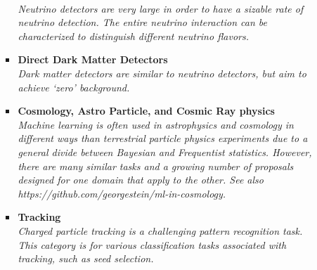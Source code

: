 \documentclass[12pt,letterpaper]{article}
\begin{document}
\begin{itemize}
\begin{itemize}
\begin{itemize}
			\\\textit{Neutrino detectors are very large in order to have a sizable rate of neutrino detection.  The entire neutrino interaction can be characterized to distinguish different neutrino flavors.}
			\item \textbf{Direct Dark Matter Detectors}~\cite{Ilyasov_2020,Akerib:2020aws,Khosa:2019qgp,Golovatiuk:2021lqn,McDonald:2021hus,Coarasa:2021fpv,Herrero-Garcia:2021goa,Liang:2021nsz,Li:2022tvg,Biassoni:2023lih}
			\\\textit{Dark matter detectors are similar to neutrino detectors, but aim to achieve `zero' background.}
			\item \textbf{Cosmology, Astro Particle, and Cosmic Ray physics}~\cite{Ostdiek:2020cqz,Brehmer:2019jyt,Tsai:2020vcx,Verma:2020gnq,Aab:2021rcn,Balazs:2021uhg,gonzalez2021tackling,Conceicao:2021xgn,huang2021convolutionalneuralnetwork,Droz:2021wnh,Han:2021kjx,Arjona:2021hmg,1853992,Shih:2021kbt,Ikeda:2021sxm,Aizpuru:2021vhd,Vago:2021grx,List:2021aer,Kahlhoefer:2021sha,Sabiu:2021aea,Mishra-Sharma:2021nhh,Mishra-Sharma:2021oxe,Bister:2021arb,Chen:2019avc,De:2022sde,Montel:2022fhv,Glauch:2022xth,Sun:2022djj,Abel:2022nje,Zhang:2022djp,Nguyen:2022ldb,Goriely:2022upe,Kim:2023wuk,Zhou:2023cfs,Carvalho:2023ele,Cai:2023gol,Krastev:2023fnh}
			\\\textit{Machine learning is often used in astrophysics and cosmology in different ways than terrestrial particle physics experiments due to a general divide between Bayesian and Frequentist statistics.  However, there are many similar tasks and a growing number of proposals designed for one domain that apply to the other.  See also https://github.com/georgestein/ml-in-cosmology.}
			\item \textbf{Tracking}~\cite{Farrell:DLPS2017,Farrell:2018cjr,Amrouche:2019wmx,Ju:2020xty,Akar:2020jti,Shlomi:2020ufi,Choma:2020cry,Siviero:2020tim,Fox:2020hfm,Amrouche:2021tlm,goto2021development,Biscarat:2021dlj,Akar:2021gns,Thais:2021qcb,Ju:2021ayy,Dezoort:2021kfk,Edmonds:2021lzd,Lavrik:2021zgt,Huth:2021zcm,Goncharov:2021wvd,Wang:2022oer,Alonso-Monsalve:2022zlm,Bakina:2022mhs,Akram:2022zmj,Sun:2022bxx,Abidi:2022ogh,Bae:2023eec,Knipfer:2023zrv,Akar:2023zhd}
			\\\textit{Charged particle tracking is a challenging pattern recognition task.  This category is for various classification tasks associated with tracking, such as seed selection.}

\end{itemize}
\end{itemize}
\end{itemize}
\end{document}
